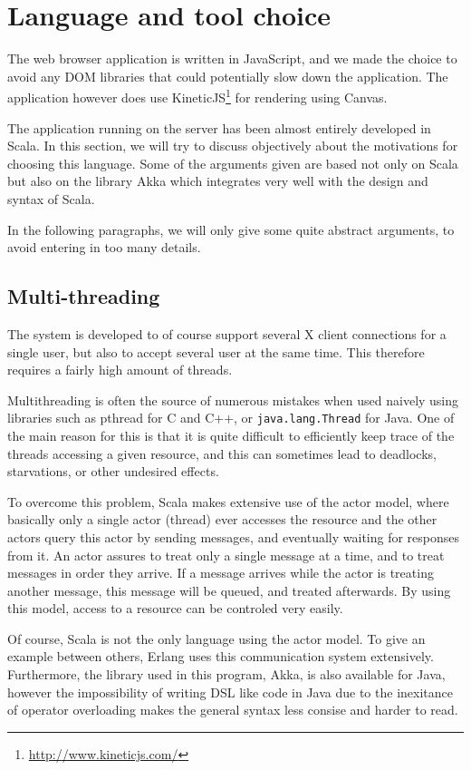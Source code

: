 \section{Language and tool choice}
%
The web browser application is written in JavaScript, and we made the 
choice to avoid any DOM libraries that could potentially slow down the application.
The application however does use KineticJS\footnote{\url{http://www.kineticjs.com/}}
for rendering using Canvas.
%

The application running on the server has been almost entirely developed in Scala. 
In this section, we will try to discuss objectively about 
the motivations for choosing this language. Some of the arguments given 
are based not only on Scala but also on the library Akka which integrates 
very well with the design and syntax of Scala.

In the following paragraphs, we will only give some quite abstract arguments, 
to avoid entering in too many details. %
%
\subsection{Multi-threading}
The system is developed to of course support several X client connections 
for a single user, but also to accept several user at the same time.
This therefore requires a fairly high amount of threads.

Multithreading is often the source of numerous mistakes when used naively 
using libraries such as pthread for C and C++, or \lstinline{java.lang.Thread} 
for Java. One of the main reason for this is that it is quite difficult to 
efficiently keep trace of the threads accessing a given resource, 
and this can sometimes lead to deadlocks, starvations, or other undesired 
effects.

To overcome this problem, Scala makes extensive use of the actor model, where 
basically only a single actor (thread) ever accesses the resource and 
the other actors query this actor by sending messages, and eventually waiting 
for responses from it. An actor assures to treat only a single message 
at a time, and to treat messages in order they arrive. If a message 
arrives while the actor is treating another message, this message will 
be queued, and treated afterwards. By using this model, access to a 
resource can be controled very easily.

Of course, Scala is not the only language using the actor model. To 
give an example between others, Erlang uses this communication system 
extensively. Furthermore, the library used in this program, Akka, is
also available for Java, however the impossibility of writing DSL like 
code in Java due to the inexitance of operator overloading makes the 
general syntax less consise and harder to read.
%
